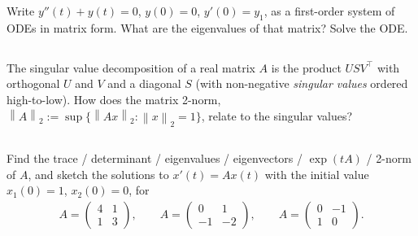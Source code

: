\documentclass[12pt,a4paper]{article}
\newcommand{\norm}[1]{\left\|#1\right\|}
\begin{document}
    Write $y''(t) + y(t) = 0$, $y(0) = 0$, $y'(0) = y_1$,
    as a first-order system of ODEs in matrix form.
    What are the eigenvalues of that matrix?
    Solve the ODE.

    \subsection{}

    The singular value decomposition of a real matrix $A$
    is the product $U S V^\top$ 
    with orthogonal $U$ and $V$
    and 
    a diagonal $S$ 
    (with non-negative \emph{singular values} ordered high-to-low).
    How does the matrix 2-norm,
    $
        \norm{ A }_2
        :=
        \sup \{ \norm{ A x }_2 : \norm{x}_2 = 1 \}
    $,
    relate to the singular values?
    
    \subsection{}
    
    Find the 
    trace / determinant / eigenvalues / eigenvectors / $\exp(t A)$ / 2-norm
    of $A$,
    and
    sketch the solutions
    to $x'(t) = A x(t)$
    with the initial value
    $x_1(0) = 1$, $x_2(0) = 0$,
    for
    \begin{align*}
        A = 
        \begin{pmatrix}
            4 & 1 \\ 1 & 3
        \end{pmatrix}
        ,
        \qquad
        A = 
        \begin{pmatrix}
            0 & 1 \\ -1 & -2
        \end{pmatrix}
        ,
        \qquad
        A = 
        \begin{pmatrix}
            0 & -1 \\ 1 & 0
        \end{pmatrix}
        .
    \end{align*}
    
    \subsection{}
    
\end{document}

